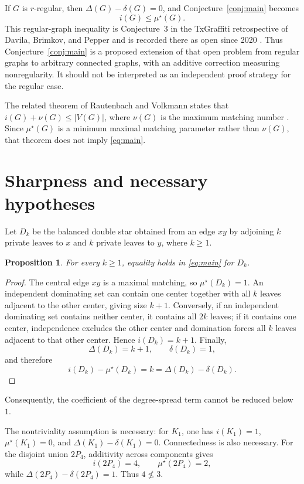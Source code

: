 \documentclass[11pt]{article}
\newtheorem{proposition}{Proposition}
\newcommand{\mustar}{\mu^{\star}}
\begin{document}
If $G$ is $r$-regular, then $\Delta(G)-\delta(G)=0$, and Conjecture~\ref{conj:main} becomes
\[
 i(G)\leq\mustar(G).
\]
This regular-graph inequality is Conjecture~3 in the TxGraffiti retrospective of Davila, Brimkov, and Pepper and is recorded there as open since 2020 \cite{davila2025}. Thus Conjecture~\ref{conj:main} is a proposed extension of that open problem from regular graphs to arbitrary connected graphs, with an additive correction measuring nonregularity. It should not be interpreted as an independent proof strategy for the regular case.

The related theorem of Rautenbach and Volkmann states that $i(G)+\nu(G)\leq |V(G)|$, where $\nu(G)$ is the maximum matching number \cite{rautenbach2002}. Since $\mustar(G)$ is a minimum maximal matching parameter rather than $\nu(G)$, that theorem does not imply \eqref{eq:main}.

\section{Sharpness and necessary hypotheses}
Let $D_k$ be the balanced double star obtained from an edge $xy$ by adjoining $k$ private leaves to $x$ and $k$ private leaves to $y$, where $k\geq1$.

\begin{proposition}\label{prop:sharp}
For every $k\geq1$, equality holds in \eqref{eq:main} for $D_k$.
\end{proposition}

\begin{proof}
The central edge $xy$ is a maximal matching, so $\mustar(D_k)=1$. An independent dominating set can contain one center together with all $k$ leaves adjacent to the other center, giving size $k+1$. Conversely, if an independent dominating set contains neither center, it contains all $2k$ leaves; if it contains one center, independence excludes the other center and domination forces all $k$ leaves adjacent to that other center. Hence $i(D_k)=k+1$. Finally,
\[
 \Delta(D_k)=k+1,\qquad \delta(D_k)=1,
\]
and therefore
\[
 i(D_k)-\mustar(D_k)=k=\Delta(D_k)-\delta(D_k).
\]
\end{proof}

Consequently, the coefficient of the degree-spread term cannot be reduced below $1$.

The nontriviality assumption is necessary: for $K_1$, one has $i(K_1)=1$, $\mustar(K_1)=0$, and $\Delta(K_1)-\delta(K_1)=0$. Connectedness is also necessary. For the disjoint union $2P_4$, additivity across components gives
\[
 i(2P_4)=4,\qquad \mustar(2P_4)=2,
\]
while $\Delta(2P_4)-\delta(2P_4)=1$. Thus $4\nleq 3$.
\end{document}
